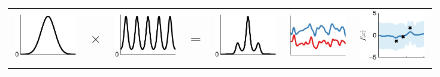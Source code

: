 \begin{figure}
\begin{tabular}{ccccc|c|c}
 \includegraphics[width=\fw]{../figures/structure_examples/se_kernel} & $\times$ & \includegraphics[width=\fw]{../figures/structure_examples/per_kernel} & = & \includegraphics[width=\fw]{../figures/structure_examples/se_times_per} & \includegraphics[width=\fw]{../figures/structure_examples/se_times_per_draws} & \includegraphics[width=\fw]{../figures/structure_examples/se_times_per_post} \\

\end{tabular}
\end{figure}
